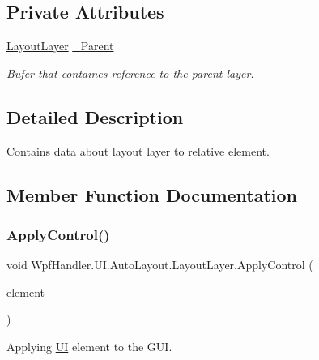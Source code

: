 \subsection*{Private Attributes}
\begin{DoxyCompactItemize}
\item 
\mbox{\hyperlink{class_wpf_handler_1_1_u_i_1_1_auto_layout_1_1_layout_layer}{Layout\+Layer}} \mbox{\hyperlink{class_wpf_handler_1_1_u_i_1_1_auto_layout_1_1_layout_layer_a4897233d2f53f207ad18c3e29e3356e6}{\+\_\+\+Parent}}
\begin{DoxyCompactList}\small\item\em Bufer that containes reference to the parent layer. \end{DoxyCompactList}\end{DoxyCompactItemize}


\subsection{Detailed Description}
Contains data about layout layer to relative element. 



\subsection{Member Function Documentation}
\mbox{\label{class_wpf_handler_1_1_u_i_1_1_auto_layout_1_1_layout_layer_a0f17411e0b1732930511f9db6b07cf29}} 
\subsubsection{\texorpdfstring{Apply\+Control()}{ApplyControl()}}
{\footnotesize\ttfamily void Wpf\+Handler.\+U\+I.\+Auto\+Layout.\+Layout\+Layer.\+Apply\+Control (\begin{DoxyParamCaption}\item[{Framework\+Element}]{element }\end{DoxyParamCaption})}



Applying \mbox{\hyperlink{namespace_wpf_handler_1_1_u_i}{UI}} element to the G\+UI. 


